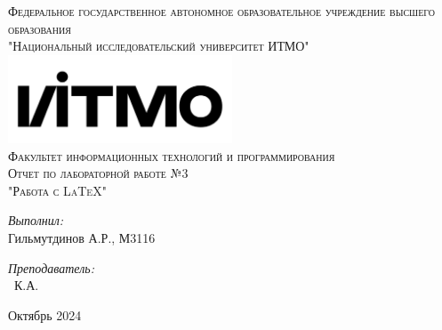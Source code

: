 \begin{titlepage}
	\begin{center}
		
		\textsc{\Large Федеральное государственное автономное образовательное учреждение высшего образования}\\
		\textsc{\large "Национальный исследовательский университет ИТМО"}\\[0.5cm]
		
		\includegraphics[width=0.5\textwidth]{img/logo.png}~\\[0.5cm]
		
		\textsc{\Large Факультет информационных технологий и программирования\ \\ Отчет по лабораторной работе №3 \\ "Работа с \LaTeX"\\[5cm]}
		
		
		\noindent
		\begin{minipage}{0.4\textwidth}
			\begin{flushleft} \large
				\emph{Выполнил:}\\
				Гильмутдинов \textsc{А.Р.}, М3116
			\end{flushleft}
		\end{minipage}
		\begin{minipage}{0.4\textwidth}
			\begin{flushright} \large
				\emph{Преподаватель:}\\
				\quad\quad{}\ \textsc{К.А.}
			\end{flushright}
		\end{minipage}
		
		\vfill
		
		{\large Октябрь 2024}
		
	\end{center}
\end{titlepage}